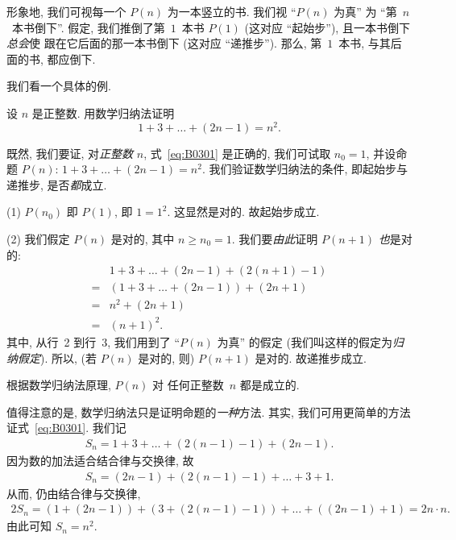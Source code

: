 形象地, 我们可视每一个 \(P(n)\) 为一本竖立的书.
我们视 ``\(P(n)\) 为真'' 为
``第~\(n\)~本书倒下''.
假定, 我们推倒了第~\(1\)~本书 \(P(1)\) (这对应 ``起始步''),
且一本书倒下\emph{总会}使%
跟在它后面的那一本书倒下 (这对应 ``递推步'').
那么, 第~\(1\)~本书, 与其后面的书,
都应倒下.

\vspace{2ex}

我们看一个具体的例.

\begin{example}
    设 \(n\) 是正整数.
    用数学归纳法证明
    \begin{equation}
        1 + 3 + \dots + (2n - 1) = n^2.
        \label{eq:B0301}
    \end{equation}

    既然, 我们要证, 对\emph{正整数} \(n\),
    式~\eqref{eq:B0301} 是正确的,
    我们可试取 \(n_0 = 1\),
    并设命题 \(P(n)\): \(1 + 3 + \dots + (2n - 1) = n^2\).
    我们验证数学归纳法的条件,
    即起始步与递推步,
    是否\emph{都}成立.

    (1)
    \(P(n_0)\) 即 \(P(1)\), 即 \(1 = 1^2\).
    这显然是对的.
    故起始步成立.

    (2)
    我们假定 \(P(n)\) 是对的, 其中 \(n \geq n_0 = 1\).
    我们要\emph{由此}证明 \(P(n+1)\) \emph{也}是对的:
    \begin{align*}
             & 1 + 3 + \dots + (2n - 1) + (2(n+1) - 1)
        \\
        = {} & (1 + 3 + \dots + (2n - 1)) + (2n + 1)
        \\
        = {} & n^2 + (2n + 1)
        \\
        = {} & (n + 1)^2.
    \end{align*}
    其中, 从行~2 到行~3,
    我们用到了 ``\(P(n)\) 为真'' 的假定
    (我们叫这样的假定为\emph{归纳假定}).
    所以, (若 \(P(n)\) 是对的, 则) \(P(n+1)\) 是对的.
    故递推步成立.

    根据数学归纳法原理, \(P(n)\) 对%
    任何正整数~\(n\) 都是成立的.
\end{example}

值得注意的是, 数学归纳法只是证明命题的\emph{一种}方法.
其实, 我们可用更简单的方法证式~\eqref{eq:B0301}.
我们记
\begin{align*}
    S_n = 1 + 3 + \dots + (2(n-1) - 1) + (2n - 1).
\end{align*}
因为数的加法适合结合律与交换律, 故
\begin{align*}
    S_n = (2n - 1) + (2(n-1) - 1) + \dots + 3 + 1.
\end{align*}
从而, 仍由结合律与交换律,
\begin{align*}
    2S_n = (1 + (2n - 1)) + (3 + (2(n-1) - 1))
    + \dots + ((2n - 1) + 1) = 2n \cdot n.
\end{align*}
由此可知 \(S_n = n^2\).


